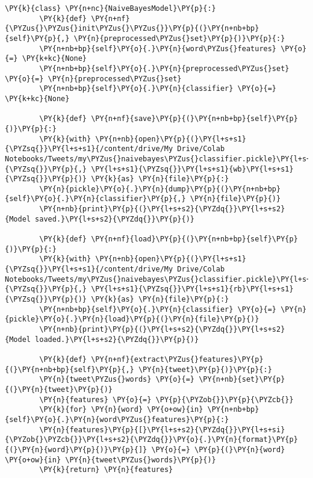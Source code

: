 \begin{tcolorbox}[breakable, size=fbox, boxrule=1pt, pad at break*=1mm,colback=cellbackground, colframe=cellborder]
    \begin{Verbatim}[commandchars=\\\{\}]
        \PY{k}{class} \PY{n+nc}{NaiveBayesModel}\PY{p}{:}
        \PY{k}{def} \PY{n+nf}{\PYZus{}\PYZus{}init\PYZus{}\PYZus{}}\PY{p}{(}\PY{n+nb+bp}{self}\PY{p}{,} \PY{n}{preprocessed\PYZus{}set}\PY{p}{)}\PY{p}{:}
        \PY{n+nb+bp}{self}\PY{o}{.}\PY{n}{word\PYZus{}features} \PY{o}{=} \PY{k+kc}{None}
        \PY{n+nb+bp}{self}\PY{o}{.}\PY{n}{preprocessed\PYZus{}set} \PY{o}{=} \PY{n}{preprocessed\PYZus{}set}
        \PY{n+nb+bp}{self}\PY{o}{.}\PY{n}{classifier} \PY{o}{=} \PY{k+kc}{None}

        \PY{k}{def} \PY{n+nf}{save}\PY{p}{(}\PY{n+nb+bp}{self}\PY{p}{)}\PY{p}{:}
        \PY{k}{with} \PY{n+nb}{open}\PY{p}{(}\PY{l+s+s1}{\PYZsq{}}\PY{l+s+s1}{/content/drive/My Drive/Colab Notebooks/Tweets/my\PYZus{}naivebayes\PYZus{}classifier.pickle}\PY{l+s+s1}{\PYZsq{}}\PY{p}{,} \PY{l+s+s1}{\PYZsq{}}\PY{l+s+s1}{wb}\PY{l+s+s1}{\PYZsq{}}\PY{p}{)} \PY{k}{as} \PY{n}{file}\PY{p}{:}
        \PY{n}{pickle}\PY{o}{.}\PY{n}{dump}\PY{p}{(}\PY{n+nb+bp}{self}\PY{o}{.}\PY{n}{classifier}\PY{p}{,} \PY{n}{file}\PY{p}{)}
        \PY{n+nb}{print}\PY{p}{(}\PY{l+s+s2}{\PYZdq{}}\PY{l+s+s2}{Model saved.}\PY{l+s+s2}{\PYZdq{}}\PY{p}{)}

        \PY{k}{def} \PY{n+nf}{load}\PY{p}{(}\PY{n+nb+bp}{self}\PY{p}{)}\PY{p}{:}
        \PY{k}{with} \PY{n+nb}{open}\PY{p}{(}\PY{l+s+s1}{\PYZsq{}}\PY{l+s+s1}{/content/drive/My Drive/Colab Notebooks/Tweets/my\PYZus{}naivebayes\PYZus{}classifier.pickle}\PY{l+s+s1}{\PYZsq{}}\PY{p}{,} \PY{l+s+s1}{\PYZsq{}}\PY{l+s+s1}{rb}\PY{l+s+s1}{\PYZsq{}}\PY{p}{)} \PY{k}{as} \PY{n}{file}\PY{p}{:}
        \PY{n+nb+bp}{self}\PY{o}{.}\PY{n}{classifier} \PY{o}{=} \PY{n}{pickle}\PY{o}{.}\PY{n}{load}\PY{p}{(}\PY{n}{file}\PY{p}{)}
        \PY{n+nb}{print}\PY{p}{(}\PY{l+s+s2}{\PYZdq{}}\PY{l+s+s2}{Model loaded.}\PY{l+s+s2}{\PYZdq{}}\PY{p}{)}

        \PY{k}{def} \PY{n+nf}{extract\PYZus{}features}\PY{p}{(}\PY{n+nb+bp}{self}\PY{p}{,} \PY{n}{tweet}\PY{p}{)}\PY{p}{:}
        \PY{n}{tweet\PYZus{}words} \PY{o}{=} \PY{n+nb}{set}\PY{p}{(}\PY{n}{tweet}\PY{p}{)}
        \PY{n}{features} \PY{o}{=} \PY{p}{\PYZob{}}\PY{p}{\PYZcb{}}
        \PY{k}{for} \PY{n}{word} \PY{o+ow}{in} \PY{n+nb+bp}{self}\PY{o}{.}\PY{n}{word\PYZus{}features}\PY{p}{:}
        \PY{n}{features}\PY{p}{[}\PY{l+s+s2}{\PYZdq{}}\PY{l+s+si}{\PYZob{}\PYZcb{}}\PY{l+s+s2}{\PYZdq{}}\PY{o}{.}\PY{n}{format}\PY{p}{(}\PY{n}{word}\PY{p}{)}\PY{p}{]} \PY{o}{=} \PY{p}{(}\PY{n}{word} \PY{o+ow}{in} \PY{n}{tweet\PYZus{}words}\PY{p}{)}
        \PY{k}{return} \PY{n}{features}


\end{Verbatim}
\end{tcolorbox}
